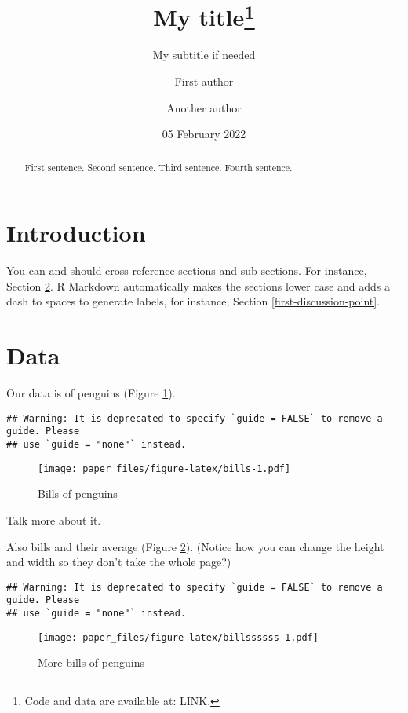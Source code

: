 \documentclass[
]{article}
\title{My title\thanks{Code and data are available at: LINK.}}
\subtitle{My subtitle if needed}
\author{First author \and Another author}
\date{05 February 2022}
\begin{document}
\maketitle
\begin{abstract}
First sentence. Second sentence. Third sentence. Fourth sentence.
\end{abstract}

\hypertarget{introduction}{%
\section{Introduction}\label{introduction}}

You can and should cross-reference sections and sub-sections. For instance, Section \ref{data}. R Markdown automatically makes the sections lower case and adds a dash to spaces to generate labels, for instance, Section \ref{first-discussion-point}.

\hypertarget{data}{%
\section{Data}\label{data}}

Our data is of penguins (Figure \ref{fig:bills}).

\begin{verbatim}
## Warning: It is deprecated to specify `guide = FALSE` to remove a guide. Please
## use `guide = "none"` instead.
\end{verbatim}

\begin{figure}
\centering
\texttt{[image: paper\_files/figure-latex/bills-1.pdf]}
\caption{\label{fig:bills}Bills of penguins}
\end{figure}

Talk more about it.

Also bills and their average (Figure \ref{fig:billssssss}). (Notice how you can change the height and width so they don't take the whole page?)

\begin{verbatim}
## Warning: It is deprecated to specify `guide = FALSE` to remove a guide. Please
## use `guide = "none"` instead.
\end{verbatim}

\begin{figure}
\centering
\texttt{[image: paper\_files/figure-latex/billssssss-1.pdf]}
\caption{\label{fig:billssssss}More bills of penguins}
\end{figure}
\end{document}
